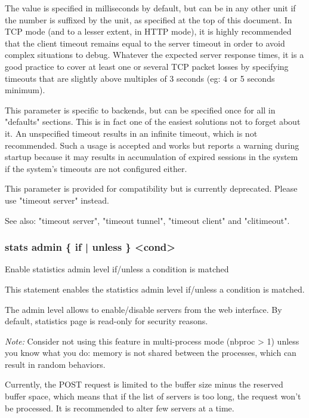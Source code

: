   The value is specified in milliseconds by default, but can be in any other
  unit if the number is suffixed by the unit, as specified at the top of this
  document. In TCP mode (and to a lesser extent, in HTTP mode), it is highly
  recommended that the client timeout remains equal to the server timeout in
  order to avoid complex situations to debug. Whatever the expected server
  response times, it is a good practice to cover at least one or several TCP
  packet losses by specifying timeouts that are slightly above multiples of 3
  seconds (eg: 4 or 5 seconds minimum).

  This parameter is specific to backends, but can be specified once for all in
  "defaults" sections. This is in fact one of the easiest solutions not to
  forget about it. An unspecified timeout results in an infinite timeout, which
  is not recommended. Such a usage is accepted and works but reports a warning
  during startup because it may results in accumulation of expired sessions in
  the system if the system's timeouts are not configured either.

  This parameter is provided for compatibility but is currently deprecated.
  Please use "timeout server" instead.

  See also: "timeout server", "timeout tunnel", "timeout client" and
             "clitimeout".

\subsubsection[stats admin]{stats admin \{ if | unless \} <cond>}


  Enable statistics admin level if/unless a condition is matched


  This statement enables the statistics admin level if/unless a condition is
  matched.

  The admin level allows to enable/disable servers from the web interface. By
  default, statistics page is read-only for security reasons.

  \emph{Note:} Consider not using this feature in multi-process mode (nbproc > 1)
         unless you know what you do: memory is not shared between the
         processes, which can result in random behaviors.

  Currently, the POST request is limited to the buffer size minus the reserved
  buffer space, which means that if the list of servers is too long, the
  request won't be processed. It is recommended to alter few servers at a
  time.
  
